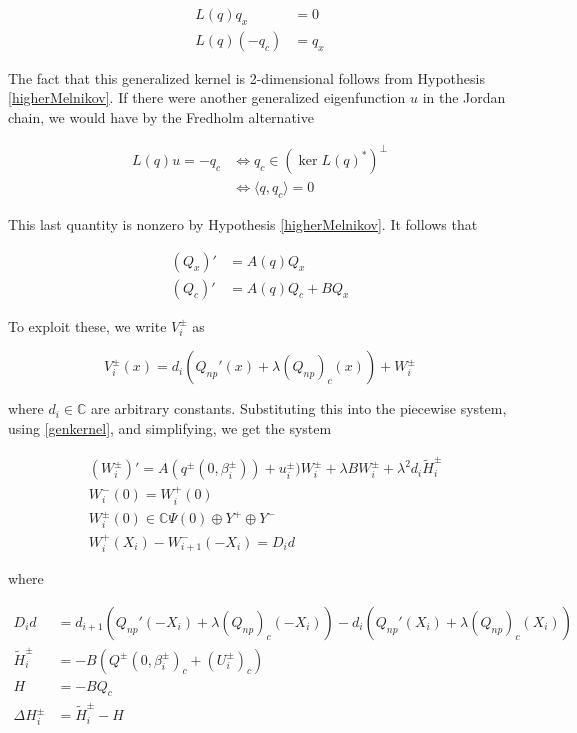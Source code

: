 \documentclass[12pt]{article}
\def\C{{\mathbb C}}
\begin{document}
\begin{align}\label{genkernel}
L(q)q_x &= 0 \nonumber \\
L(q)(-q_c) &= q_x
\end{align}

The fact that this generalized kernel is 2-dimensional follows from Hypothesis \ref{higherMelnikov}. If there were another generalized eigenfunction $u$ in the Jordan chain, we would have by the Fredholm alternative

\begin{align*}
L(q) u = -q_c &\iff q_c \in (\ker L(q)^*)^\perp \\
&\iff \langle q, q_c \rangle = 0 
\end{align*} 

This last quantity is nonzero by Hypothesis \ref{higherMelnikov}. It follows that

\begin{align*}
(Q_x)' &= A(q) Q_x \\
(Q_c)' &= A(q) Q_c + B Q_x
\end{align*}

To exploit these, we write $V_i^\pm$ as 

\begin{equation}
V_i^\pm(x) = d_i (Q_{np}'(x) + \lambda (Q_{np})_c(x)) + W_i^\pm 
\end{equation}

where $d_i \in \C$ are arbitrary constants. Substituting this into the piecewise system, using \eqref{genkernel}, and simplifying, we get the system

\begin{align*}
&(W_i^\pm)' = A( q^\pm(0, \beta_i^\pm) ) + u_i^\pm) W_i^\pm + \lambda B W_i^\pm + \lambda^2 d_i \tilde{H}_i^\pm \\
&W_i^-(0) = W_i^+(0) \\
&W_i^\pm(0) \in \C \Psi(0) \oplus Y^+ \oplus Y^- \\
&W_i^+(X_i) - W_{i+1}^-(-X_i) = D_i d
\end{align*}

where

\begin{align*}
D_i d &= d_{i+1}(Q_{np}'(-X_i) + \lambda (Q_{np})_c(-X_i))
- d_i ( Q_{np}'(X_i) + \lambda (Q_{np})_c(X_i) ) \\
\tilde{H}_i^\pm &= -B( Q^\pm(0, \beta_i^\pm)_c + (U_i^\pm)_c)  \\
H &= -B Q_c \\
\Delta H_i^\pm &= \tilde{H}_i^\pm - H
\end{align*}
\end{document}
